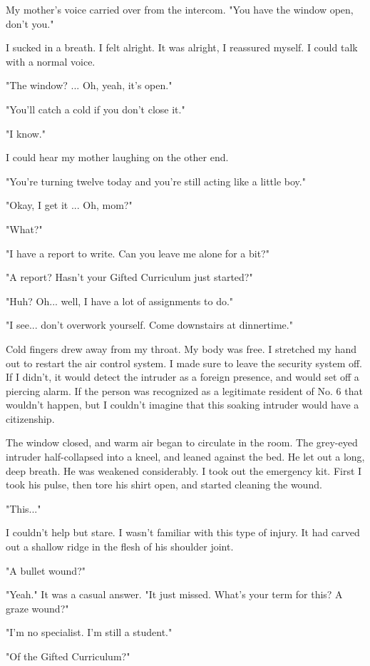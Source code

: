 My mother's voice carried over from the intercom. "You have the window
open, don't you."

I sucked in a breath. I felt alright. It was alright, I reassured
myself. I could talk with a normal voice.

"The window? ... Oh, yeah, it's open."

"You'll catch a cold if you don't close it."

"I know."

I could hear my mother laughing on the other end.

"You're turning twelve today and you're still acting like a little boy."

"Okay, I get it ... Oh, mom?"

"What?"

"I have a report to write. Can you leave me alone for a bit?"

"A report? Hasn't your Gifted Curriculum just started?"

"Huh? Oh... well, I have a lot of assignments to do."

"I see... don't overwork yourself. Come downstairs at dinnertime."

Cold fingers drew away from my throat. My body was free. I stretched my
hand out to restart the air control system. I made sure to leave the
security system off. If I didn't, it would detect the intruder as a
foreign presence, and would set off a piercing alarm. If the person was
recognized as a legitimate resident of No. 6 that wouldn't happen, but I
couldn't imagine that this soaking intruder would have a citizenship.

The window closed, and warm air began to circulate in the room. The
grey-eyed intruder half-collapsed into a kneel, and leaned against the
bed. He let out a long, deep breath. He was weakened considerably. I
took out the emergency kit. First I took his pulse, then tore his shirt
open, and started cleaning the wound.

"This..."

I couldn't help but stare. I wasn't familiar with this type of injury.
It had carved out a shallow ridge in the flesh of his shoulder joint.

"A bullet wound?"

"Yeah." It was a casual answer. "It just missed. What's your term for
this? A graze wound?"

"I'm no specialist. I'm still a student."

"Of the Gifted Curriculum?"

